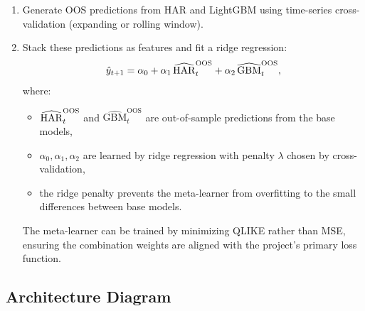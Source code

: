 \begin{enumerate}
  \item Generate OOS predictions from HAR and LightGBM using
        time-series cross-validation (expanding or rolling window).
  \item Stack these predictions as features and fit a ridge regression:
        \begin{equation}\label{eq:stacking}
          \hat{y}_{t+1} = \alpha_0 + \alpha_1\,\widehat{\operatorname{HAR}}_t^{\text{OOS}}
            + \alpha_2\,\widehat{\text{GBM}}_t^{\text{OOS}},
        \end{equation}
        where:
        \begin{itemize}
          \item $\widehat{\operatorname{HAR}}_t^{\text{OOS}}$ and
                $\widehat{\text{GBM}}_t^{\text{OOS}}$ are out-of-sample
                predictions from the base models,
          \item $\alpha_0, \alpha_1, \alpha_2$ are learned by ridge
                regression with penalty $\lambda$ chosen by
                cross-validation,
          \item the ridge penalty prevents the meta-learner from
                overfitting to the small differences between base
                models.
        \end{itemize}

        \begin{projectconnection}
        The meta-learner can be trained by
        minimizing QLIKE rather than MSE, ensuring the combination
        weights are aligned with the project's primary loss function.
        \end{projectconnection}
\end{enumerate}

\subsection{Architecture Diagram}

